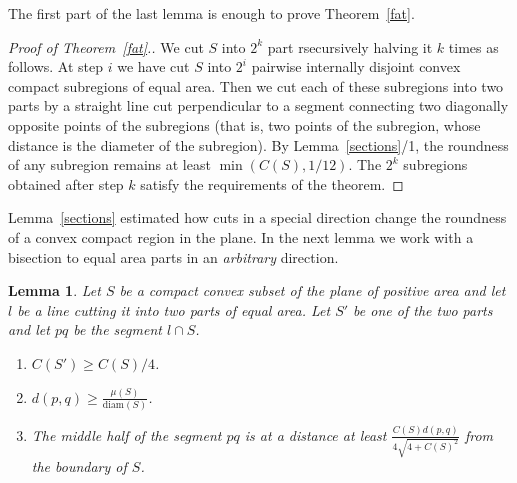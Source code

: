 \documentclass[12pt]{article}
\theoremstyle{plain}
\newtheorem{lemma}[theorem]{Lemma}
\theoremstyle{definition}
\theoremstyle{remark}
\def\diam{\mathrm{diam}}
\begin{document}
The first part of the last lemma is enough to prove Theorem~\ref{fat}.

\begin{proof}[Proof of Theorem~\ref{fat}.]
We cut $S$ into $2^k$ part rsecursively halving it $k$ times as follows. At step $i$ we have cut $S$ into $2^i$ pairwise internally disjoint convex compact subregions of equal area. Then we cut each of these subregions into two parts by a straight line cut perpendicular to a segment connecting two diagonally opposite points of the subregions (that is, two points of the subregion, whose distance is the diameter of the subregion). By Lemma~\ref{sections}/1, the roundness of any subregion remains at least $\min(C(S),1/12)$. The $2^k$ subregions obtained after step $k$ satisfy the requirements of the theorem.
\end{proof}

Lemma~\ref{sections} estimated how cuts in a special direction change the roundness of a convex compact region in the plane. In the next lemma we work with a bisection to equal area parts in an \emph{arbitrary} direction.

\begin{lemma}\label{longcut}
Let $S$ be a compact convex subset of the plane of positive area and let $l$ be a line cutting it into two parts of equal area. Let $S'$ be one of the two parts and let $pq$ be the segment $l\cap S$.
\begin{enumerate}
\item $C(S')\ge C(S)/4$.
\item $d(p,q)\ge\frac{\mu(S)}{\diam(S)}$.
\item The middle half of the segment $pq$ is at a distance at least $\frac{C(S)d(p,q)}{4\sqrt{4+C(S)^2}}$ from the boundary of $S$.
\end{enumerate}
\end{lemma}
\end{document}
